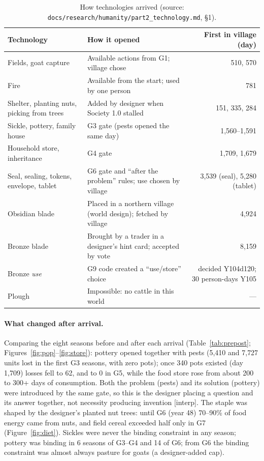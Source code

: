 \documentclass[11pt]{article}
\newcommand{\lbl}[1]{\textsf{[#1]}}
\begin{document}
\begin{table}[t]
\centering\small
\caption{How technologies arrived (source: \texttt{docs/research/humanity/part2\_technology.md}, \S1).}
\label{tab:techwho}
\begin{tabularx}{\linewidth}{@{}l L r@{}}
\toprule
Technology & How it opened & First in village (day) \\
\midrule
Fields, goat capture & Available actions from G1; village chose & 510, 570 \\
Fire & Available from the start; used by one person & 781 \\
Shelter, planting nuts, picking from trees & Added by designer when Society 1.0 stalled & 151, 335, 284 \\
Sickle, pottery, family house & G3 gate (pests opened the same day) & 1{,}560--1{,}591 \\
Household store, inheritance & G4 gate & 1{,}709, 1{,}679 \\
Seal, sealing, tokens, envelope, tablet & G6 gate and ``after the problem'' rules; use chosen by village & 3{,}539 (seal), 5{,}280 (tablet) \\
Obsidian blade & Placed in a northern village (world design); fetched by village & 4{,}924 \\
Bronze blade & Brought by a trader in a designer's hint card; accepted by vote & 8{,}159 \\
Bronze \emph{use} & G9 code created a ``use/store'' choice & decided Y104d120; 30 person-days Y105 \\
Plough & Impossible: no cattle in this world & --- \\
\bottomrule
\end{tabularx}
\end{table}

\paragraph{What changed after arrival.} Comparing the eight seasons before and after each arrival (Table~\ref{tab:prepost}; Figures~\ref{fig:pop}--\ref{fig:store}): pottery opened together with pests (5{,}410 and 7{,}727 units lost in the first G3 seasons, with zero pots); once 340 pots existed (day 1{,}709) losses fell to 62, and to 0 in G5, while the food store rose from about 200 to 300+ days of consumption. Both the problem (pests) and its solution (pottery) were introduced by the same gate, so this is the designer placing a question and its answer together, not necessity producing invention \lbl{interp}. The staple was shaped by the designer's planted nut trees: until G6 (year 48) 70--90\% of food energy came from nuts, and field cereal exceeded half only in G7 (Figure~\ref{fig:diet}). Sickles were never the binding constraint in any season; pottery was binding in 6 seasons of G3--G4 and 14 of G6; from G6 the binding constraint was almost always pasture for goats (a designer-added cap).
\end{document}
